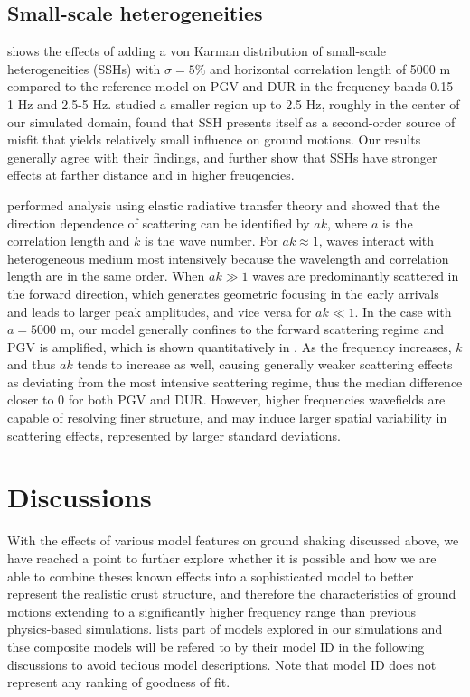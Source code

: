 \subsection{Small-scale heterogeneities}
 shows the effects of adding a von Karman distribution of small-scale heterogeneities (SSHs) with $\sigma = 5\%$ and horizontal correlation length of 5000 m compared to the reference model on PGV and DUR in the frequency bands 0.15-1 Hz and 2.5-5 Hz. \citet{savranGroundMotionSimulation2019} studied a smaller region up to 2.5 Hz, roughly in the center of our simulated domain, found that SSH presents itself as a second-order source of misfit that yields relatively small influence on ground motions. Our results generally agree with their findings, and further show that SSHs have stronger effects at farther distance and in higher freuqencies.

\citet{przybillaEstimationCrustalScattering2009} performed analysis using elastic radiative transfer theory and showed that the direction dependence of scattering can be identified by $ak$, where $a$ is the correlation length and $k$ is the wave number. For $ak \approx 1$, waves interact with heterogeneous medium most intensively because the wavelength and correlation length are in the same order. When $ak\gg 1$ waves are predominantly scattered in the forward direction, which generates geometric focusing in the early arrivals and leads to larger peak amplitudes, and vice versa for $ak \ll 1$. In the case with $a=5000$ m, our model generally confines to the forward scattering regime and PGV is amplified, which is shown quantitatively in . As the frequency increases, $k$ and thus $ak$ tends to increase as well, causing generally weaker scattering effects as deviating from the most intensive scattering regime, thus the median difference closer to 0 for both PGV and DUR. However, higher frequencies wavefields are capable of resolving finer structure, and may induce larger spatial variability in scattering effects, represented by larger standard deviations.


\section{Discussions}
With the effects of various model features on ground shaking discussed above, we have reached a point to further explore whether it is possible and how we are able to combine theses known effects into a sophisticated model to better represent the realistic crust structure, and therefore the characteristics of ground motions extending to a significantly higher frequency range than previous physics-based simulations.  lists part of models explored in our simulations and thse composite models will be refered to by their model ID in the following discussions to avoid tedious model descriptions. Note that model ID does not represent any ranking of goodness of fit.

